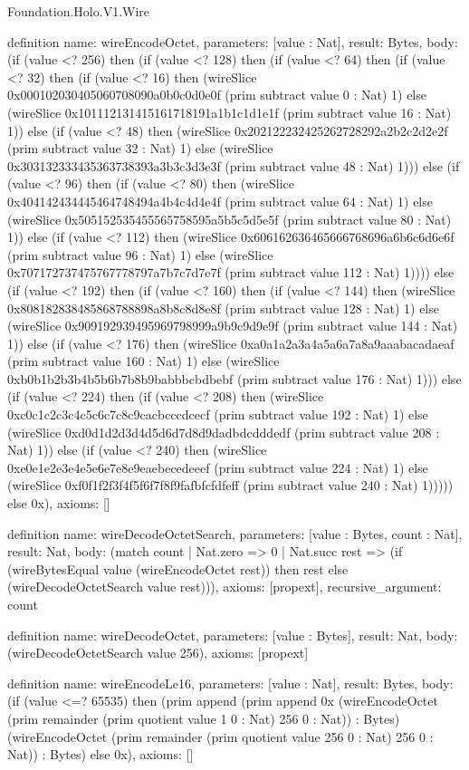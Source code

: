 \begin{lexlean}{Foundation.Holo.V1.Wire}
\begin{semanticmodule}
definition{
  name: wireEncodeOctet,
  parameters: [value : Nat],
  result: Bytes,
  body: (if (value <? 256) then (if (value <? 128) then (if (value <? 64) then (if (value <? 32) then (if (value <? 16) then (wireSlice 0x000102030405060708090a0b0c0d0e0f (prim subtract value 0 : Nat) 1) else (wireSlice 0x101112131415161718191a1b1c1d1e1f (prim subtract value 16 : Nat) 1)) else (if (value <? 48) then (wireSlice 0x202122232425262728292a2b2c2d2e2f (prim subtract value 32 : Nat) 1) else (wireSlice 0x303132333435363738393a3b3c3d3e3f (prim subtract value 48 : Nat) 1))) else (if (value <? 96) then (if (value <? 80) then (wireSlice 0x404142434445464748494a4b4c4d4e4f (prim subtract value 64 : Nat) 1) else (wireSlice 0x505152535455565758595a5b5c5d5e5f (prim subtract value 80 : Nat) 1)) else (if (value <? 112) then (wireSlice 0x606162636465666768696a6b6c6d6e6f (prim subtract value 96 : Nat) 1) else (wireSlice 0x707172737475767778797a7b7c7d7e7f (prim subtract value 112 : Nat) 1)))) else (if (value <? 192) then (if (value <? 160) then (if (value <? 144) then (wireSlice 0x808182838485868788898a8b8c8d8e8f (prim subtract value 128 : Nat) 1) else (wireSlice 0x909192939495969798999a9b9c9d9e9f (prim subtract value 144 : Nat) 1)) else (if (value <? 176) then (wireSlice 0xa0a1a2a3a4a5a6a7a8a9aaabacadaeaf (prim subtract value 160 : Nat) 1) else (wireSlice 0xb0b1b2b3b4b5b6b7b8b9babbbcbdbebf (prim subtract value 176 : Nat) 1))) else (if (value <? 224) then (if (value <? 208) then (wireSlice 0xc0c1c2c3c4c5c6c7c8c9cacbcccdcecf (prim subtract value 192 : Nat) 1) else (wireSlice 0xd0d1d2d3d4d5d6d7d8d9dadbdcdddedf (prim subtract value 208 : Nat) 1)) else (if (value <? 240) then (wireSlice 0xe0e1e2e3e4e5e6e7e8e9eaebecedeeef (prim subtract value 224 : Nat) 1) else (wireSlice 0xf0f1f2f3f4f5f6f7f8f9fafbfcfdfeff (prim subtract value 240 : Nat) 1))))) else 0x),
  axioms: []
}

definition{
  name: wireDecodeOctetSearch,
  parameters: [value : Bytes, count : Nat],
  result: Nat,
  body: (match count
    | Nat.zero => 0
    | Nat.succ rest => (if (wireBytesEqual value (wireEncodeOctet rest)) then rest else (wireDecodeOctetSearch value rest))),
  axioms: [propext],
  recursive_argument: count
}

definition{
  name: wireDecodeOctet,
  parameters: [value : Bytes],
  result: Nat,
  body: (wireDecodeOctetSearch value 256),
  axioms: [propext]
}

definition{
  name: wireEncodeLe16,
  parameters: [value : Nat],
  result: Bytes,
  body: (if (value <=? 65535) then (prim append (prim append 0x (wireEncodeOctet (prim remainder (prim quotient value 1 0 : Nat) 256 0 : Nat)) : Bytes) (wireEncodeOctet (prim remainder (prim quotient value 256 0 : Nat) 256 0 : Nat)) : Bytes) else 0x),
  axioms: []
}


\end{semanticmodule}
\end{lexlean}
